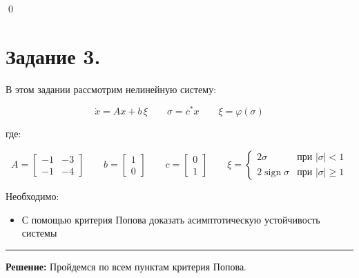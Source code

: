 \documentclass[a4paper,12pt]{article}
\begin{document}
	\qed

	\newpage
	\section{Задание 3.}
	
	В этом задании рассмотрим нелинейную систему:
	
	\[
	\dot{x} = A x + b\,\xi
	\qquad 
	\sigma = c^{*} x
	\qquad
	\xi = \varphi(\sigma)
	\]
	
	где:
	
	\[
	A =
	\begin{bmatrix}
		-1 & -3 \\
		-1 & -4
	\end{bmatrix}
	\qquad
	b =
	\begin{bmatrix}
		1 \\
		0
	\end{bmatrix}
	\qquad
	c =
	\begin{bmatrix}
		0 \\
		1
	\end{bmatrix}
	\qquad
	\xi =
	\begin{cases}
		2\sigma & \text{при } |\sigma| < 1\\[6pt]
		2\operatorname{sign}\sigma & \text{при } |\sigma| \ge 1
	\end{cases}
	\]
	
	Необходимо: 
	\begin{itemize}
		\item С помощью критерия Попова доказать асимптотическую устойчивость системы
	\end{itemize}
	
	\hrule
	\[\]	
	\textbf{Решение: } Пройдемся по всем пунктам критерия Попова.
	
\end{document}
